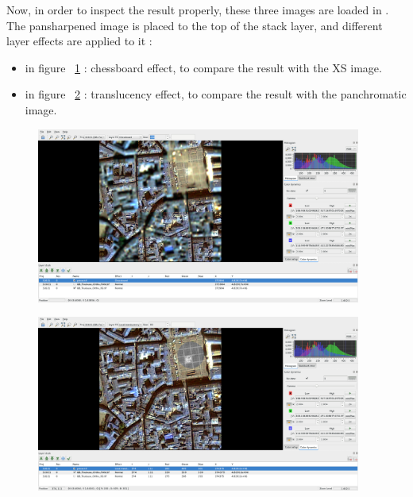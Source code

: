 Now, in order to inspect the result properly, these three images are loaded in \mont.
The pansharpened image is placed to the top of the stack layer, and different layer effects are applied to it :
\begin{itemize}
\item in figure ~\ref{fig:ps4} : chessboard effect, to compare the result with the XS image.
\item in figure ~\ref{fig:ps5} : translucency effect, to compare the result with the panchromatic image.
\end{itemize}

\begin{figure}[!h] 
  \center
  \includegraphics[width=0.95\textwidth]{../Art/MonteverdiImages/ps4.png}
  \label{fig:ps4}
\end{figure}

\begin{figure}[!h] 
  \center
  \includegraphics[width=0.95\textwidth]{../Art/MonteverdiImages/ps5.png}
  \label{fig:ps5}
\end{figure}


